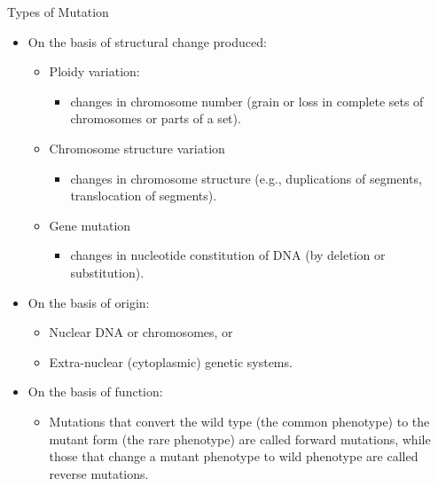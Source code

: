 \documentclass[11pt,ignorenonframetext,aspectratio=169]{beamer}
\providecommand{\tightlist}{%
  \setlength{\itemsep}{0pt}\setlength{\parskip}{0pt}}
\newcommand{\ecolumns}{\end{columns}}
\begin{document}
\begin{frame}{}
\ecolumns
\end{frame}

\begin{frame}{Types of Mutation}
\protect\hypertarget{types-of-mutation}{}
\begin{itemize}
\tightlist
\item
  On the basis of structural change produced:

  \begin{itemize}
  \tightlist
  \item
    Ploidy variation:

    \begin{itemize}
    \tightlist
    \item
      changes in chromosome number (grain or loss in complete sets of
      chromosomes or parts of a set).
    \end{itemize}
  \item
    Chromosome structure variation

    \begin{itemize}
    \tightlist
    \item
      changes in chromosome structure (e.g., duplications of segments,
      translocation of segments).
    \end{itemize}
  \item
    Gene mutation

    \begin{itemize}
    \tightlist
    \item
      changes in nucleotide constitution of DNA (by deletion or
      substitution).
    \end{itemize}
  \end{itemize}
\item
  On the basis of origin:

  \begin{itemize}
  \tightlist
  \item
    Nuclear DNA or chromosomes, or
  \item
    Extra-nuclear (cytoplasmic) genetic systems.
  \end{itemize}
\item
  On the basis of function:

  \begin{itemize}
  \tightlist
  \item
    Mutations that convert the wild type (the common phenotype) to the
    mutant form (the rare phenotype) are called forward mutations, while
    those that change a mutant phenotype to wild phenotype are called
    reverse mutations.
  \end{itemize}
\end{itemize}
\end{frame}
\end{document}
